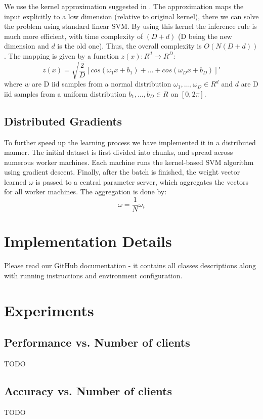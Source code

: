 \documentclass[12pt,a4paper]{article}
\begin{document}
We use the kernel approximation suggested in \cite{Rahimi07randomfeatures}. The approximation maps the input explicitly to a low dimension (relative to original kernel), there we can solve the problem using standard linear SVM. By using this kernel the inference rule is much more efficient, with time complexity of $(D+d)$ (D being the new dimension and $d$ is the old one). Thus, the overall complexity is $O(N(D+d))$. 
The mapping is given by a function $z(x): R^d \rightarrow R^D$:
\begin{equation}
z(x) = \sqrt{\frac{2}{D}}[cos(\omega_1 x + b_1) + \dots + cos(\omega_D x + b_D)]'
\end{equation}
where $w$ are D iid samples from a normal distribution $\omega_1,\dots,\omega_D \in R^d$
and $d$ are D iid samples from a uniform distribution $b_1,\dots,b_D \in R$ on $[0, 2\pi]$.


\subsection{Distributed Gradients}
To further speed up the learning process we have implemented it in a distributed manner. The initial dataset is first divided into chunks, and spread across numerous worker machines. Each machine runs the kernel-based SVM algorithm using gradient descent. Finally, after the batch is finished, the weight vector learned $\omega$ is passed to a central parameter server, which aggregates the vectors for all worker machines. The aggregation is done by:
\begin{equation}
\omega = \frac{1}{N}\omega_i
\end{equation}

\section{Implementation Details}
Please read our GitHub documentation - it contains all classes descriptions along with running instructions and environment configuration.

\section{Experiments}
\subsection{Performance vs. Number of clients}
TODO

\subsection{Accuracy vs. Number of clients}
TODO
\end{document}
